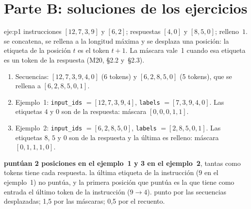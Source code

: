 \section{Parte B: soluciones de los ejercicios}

\begin{solucion}{eje:p1}
\datos instrucciones $[12,7,3,9]$ y $[6,2]$; respuestas $[4,0]$ y $[8,5,0]$; relleno~$1$.
\planteamiento se concatena, se rellena a la longitud máxima y se desplaza una posición: la etiqueta de la posición $t$ es el token $t+1$. La máscara vale~1 cuando esa etiqueta es un token de la respuesta (M20, §2.2 y~§2.3).
\pasos
\begin{enumerate}[label=\arabic*.]
  \item Secuencias: $[12,7,3,9,4,0]$ (6 tokens) y $[6,2,8,5,0]$ (5 tokens), que se rellena a $[6,2,8,5,0,1]$.
  \item Ejemplo~1: \texttt{input\_ids} $=[12,7,3,9,4]$, \texttt{labels} $=[7,3,9,4,0]$. Las etiquetas $4$ y $0$ son de la respuesta: máscara $[0,0,0,1,1]$.
  \item Ejemplo~2: \texttt{input\_ids} $=[6,2,8,5,0]$, \texttt{labels} $=[2,8,5,0,1]$. Las etiquetas $8$, $5$ y $0$ son de la respuesta y la última es relleno: máscara $[0,1,1,1,0]$.
\end{enumerate}
\resultado \textbf{puntúan 2 posiciones en el ejemplo~1 y 3 en el ejemplo~2}, tantas como tokens tiene cada respuesta.
\comprobacion la última etiqueta de la instrucción ($9$ en el ejemplo~1) no puntúa, y la primera posición que puntúa es la que tiene como entrada el último token de la instrucción ($9\to 4$).
 punto por las secuencias desplazadas; 1,5 por las máscaras; 0,5 por el recuento.


\end{solucion}
